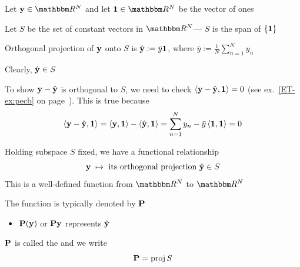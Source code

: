 \begin{frame}

    \vspace{2em}
    \Eg
    Let $\boldy \in \RR^N$ and let $\boldone \in \RR^N$ be the vector of ones
    
    Let $S$ be the set of constant vectors in $\RR^N$--- $S$ is the span of $\{{\mathbf 1}\}$
    
    Orthogonal projection of ${\mathbf y}$ onto $S$ is $\hat {\mathbf y} := \bar y
    {\mathbf 1}$, where $\bar y := \frac{1}{N} \sum_{n=1}^N y_n$
    
    Clearly, $\hat {\mathbf y} \in S$ 
    
    \vspace{.7em}
    To show ${\mathbf y} -
    \hat {\mathbf y}$ is orthogonal to $S$, we need to check
    $\left\langle{ {\mathbf y} -  \hat {\mathbf y} ,  {\mathbf 1} }\right\rangle = 0$ (see ex.~\ref{ET-ex:pecb} on
    page~\pageref{ET-ex:pecb}).  This is true because
    \begin{equation*}
        \left\langle{ {\mathbf y} -  \hat {\mathbf y} ,  {\mathbf 1} }\right\rangle
        = \left\langle{ {\mathbf y} ,  {\mathbf 1} }\right\rangle - \left\langle{ \hat {\mathbf y} ,  {\mathbf 1} }\right\rangle
        = \sum_{n=1}^N y_n - \bar y \left\langle{ {\mathbf 1} ,  {\mathbf 1} }\right\rangle
        = 0
    \end{equation*}
    
\end{frame}

\begin{frame}
    
    \vspace{2em}
    Holding subspace $S$ fixed, we have a functional relationship
    \begin{equation*}
        {\mathbf y} \; \mapsto \text{ its orthogonal projection } \hat {{\mathbf y}} \in S
    \end{equation*}
    This is a well-defined function from $\RR^N$ to $\RR^N$
    
    \vspace{.7em}
    The function is typically denoted by $\mathbf P$

    \begin{itemize}
        \item $\mathbf P({\mathbf y})$ or $\mathbf P {\mathbf y}$ represents $\hat {\mathbf y}$
    \end{itemize}
    
    $\mathbf P$ is called the  and we write
    \begin{equation*}
        \mathbf P = \operatorname{proj} S
    \end{equation*}

\end{frame}

